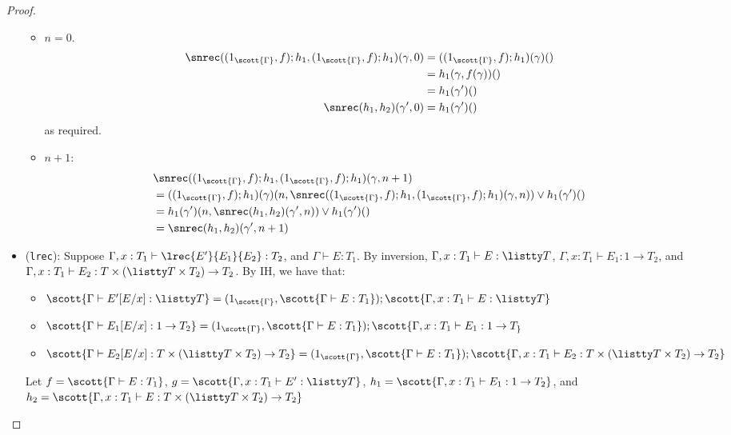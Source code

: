 \begin{proof}
\begin{itemize}
  \begin{itemize}
    \item $n = 0$. 
    \begin{align*}
      \snrec((1_{\scott{\Gamma}},f);h_1,(1_{\scott{\Gamma}},f);h_1)(\gamma,0) &= ((1_{\scott{\Gamma}},f);h_1)(\gamma)()\\
      &= h_1(\gamma,f(\gamma))()\\
      &= h_1(\gamma')()\\
      \snrec(h_1,h_2)(\gamma',0) &= h_1(\gamma')()
    \end{align*}
    as required.
    \item $n+1$:
    \begin{align*}
    &\snrec((1_{\scott{\Gamma}},f);h_1,(1_{\scott{\Gamma}},f);h_1)(\gamma,n+1)\\
    &= ((1_{\scott{\Gamma}},f);h_1)(\gamma)(n,\snrec((1_{\scott{\Gamma}},f);h_1,(1_{\scott{\Gamma}},f);h_1)(\gamma,n)) \vee h_1(\gamma')()\\
    &= h_1(\gamma')(n,\snrec(h_1,h_2)(\gamma',n)) \vee h_1(\gamma')()\\
    &= \snrec(h_1,h_2)(\gamma',n+1)
    \end{align*}
  \end{itemize}
  
  \item (\texttt{lrec}): Suppose $\Gamma, x : T_1 \vdash \lrec {E'} {E_1} {E_2} : T_2$, and $\Gamma \vdash E : T_1$. By inversion, $\Gamma,x:T_1 \vdash E : \listty T$, $\Gamma, x : T_1 \vdash E_1 : 1 \to T_2$, and $\Gamma,x:T_1 \vdash E_2 : T \times (\listty T \times T_2) \to T_2$.
  By IH, we have that:
  \begin{itemize}
    \item $\scott{\Gamma \vdash E'[E/x] : \listty T} = (1_{\scott{\Gamma}},\scott{\Gamma \vdash E : T_1}) ; \scott{\Gamma,x:T_1 \vdash E : \listty T}$
    \item $\scott{\Gamma \vdash E_1[E/x] : 1 \to T_2} = (1_{\scott{\Gamma}},\scott{\Gamma \vdash E : T_1}) ; \scott{\Gamma, x : T_1 \vdash E_1 : 1 \to T_}$
    \item $\scott{\Gamma \vdash E_2[E/x] : T \times (\listty T \times T_2) \to T_2} = (1_{\scott{\Gamma}},\scott{\Gamma \vdash E : T_1}) ; \scott{\Gamma,x:T_1 \vdash E_2 : T \times (\listty T \times T_2) \to T_2}$
  \end{itemize}
  Let $f = \scott{\Gamma \vdash E : T_1}$, $g = \scott{\Gamma,x : T_1 \vdash E' : \listty T}$, $h_1 = \scott{\Gamma,x:T_1 \vdash E_1 : 1 \to T_2}$, and $h_2 = \scott{\Gamma,x:T_1 \vdash E : T \times (\listty T \times T_2) \to T_2}$
  

\end{itemize}
\end{proof}
